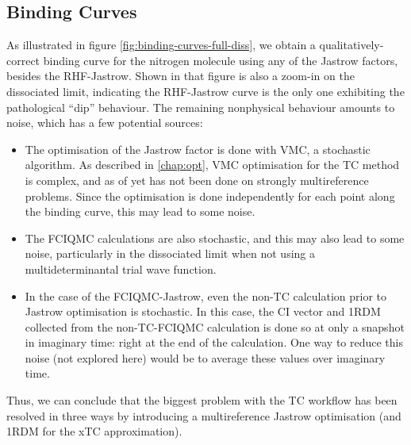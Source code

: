 \subsection{Binding Curves}

As illustrated in figure \ref{fig:binding-curves-full-diss}, we obtain a qualitatively-correct binding curve for the nitrogen molecule using any of the Jastrow factors, besides the RHF-Jastrow. Shown in that figure is also a zoom-in on the dissociated limit, indicating the RHF-Jastrow curve is the only one exhibiting the pathological ``dip'' behaviour. The remaining nonphysical behaviour amounts to noise, which has a few potential sources:
\begin{itemize}
    \item The optimisation of the Jastrow factor is done with VMC, a stochastic algorithm. As described in \autoref{chap:opt}, VMC optimisation for the TC method is complex, and as of yet has not been done on strongly multireference problems. Since the optimisation is done independently for each point along the binding curve, this may lead to some noise.
    \item The FCIQMC calculations are also stochastic, and this may also lead to some noise, particularly in the dissociated limit when not using a multideterminantal trial wave function.
    \item In the case of the FCIQMC-Jastrow, even the non-TC calculation prior to Jastrow optimisation is stochastic. In this case, the CI vector and 1RDM collected from the non-TC-FCIQMC calculation is done so at only a snapshot in imaginary time: right at the end of the calculation. One way to reduce this noise (not explored here) would be to average these values over imaginary time.
\end{itemize}
Thus, we can conclude that the biggest problem with the TC workflow has been resolved in three ways by introducing a multireference Jastrow optimisation (and 1RDM for the xTC approximation).

